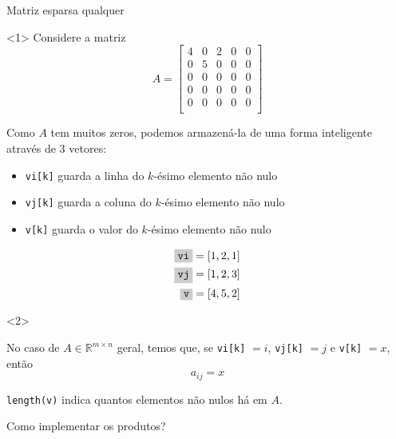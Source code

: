 \documentclass[]{beamer}
\newcommand{\R}{\mathbb{R}}
\newcommand{\code}[1]{\colorbox[gray]{0.8}{\texttt{#1}}}
\begin{document}
\begin{frame}{Matriz esparsa qualquer}

  \begin{onlyenv}<1>
    Considere a matriz
    \[
    A =
    \begin{bmatrix}
      4 & 0 & 2 & 0 & 0 \\
      0 & 5 & 0 & 0 & 0 \\
      0 & 0 & 0 & 0 & 0 \\
      0 & 0 & 0 & 0 & 0 \\
      0 & 0 & 0 & 0 & 0 \\
    \end{bmatrix}
    \]
  
    Como $A$ tem muitos zeros, podemos armazená-la de uma forma
    inteligente através de 3 vetores:

    \begin{itemize}
    \item \code{vi[k]} guarda a linha do $k$-ésimo elemento não nulo
    \item \code{vj[k]} guarda a coluna do $k$-ésimo elemento não nulo
    \item \code{v[k]} guarda o valor do $k$-ésimo elemento não nulo
    \end{itemize}

    \[
    \begin{aligned}
      \text{\code{vi}} & = [1, 2, 1] \\
      \text{\code{vj}} & = [1, 2, 3] \\
      \text{\code{v}} & = [4, 5, 2]
    \end{aligned}
    \]
  \end{onlyenv}

  \begin{onlyenv}<2>
    
    No caso de $A \in \R^{m \times n}$ geral, temos que, se
    \code{vi[k]} $= i$, \code{vj[k]} $= j$ e \code{v[k]} $= x$, então
    \[
    a_{ij} = x
    \]

    \code{length(v)} indica quantos elementos não nulos há em $A$.
    \vfill
    \begin{center}
      \large \alert{Como implementar os produtos?}
    \end{center}

  \end{onlyenv}

\end{frame}
\end{document}
